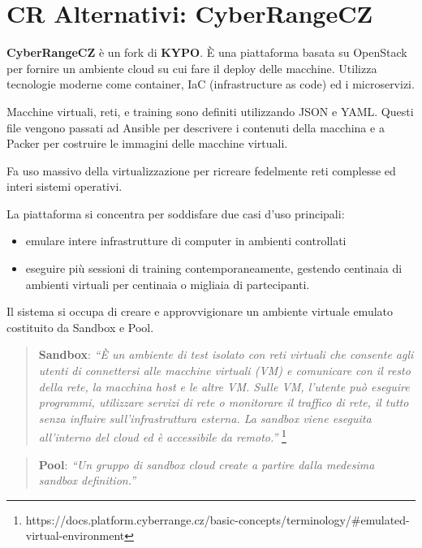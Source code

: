 \section{CR Alternativi:
CyberRangeCZ}\label{cr-alternativi-cyberrangecz}

\textbf{CyberRangeCZ} è un fork di \textbf{KYPO}. È una piattaforma
basata su OpenStack per fornire un ambiente cloud su cui fare il deploy
delle macchine. Utilizza tecnologie moderne come container, IaC
(infrastructure as code) ed i microservizi.

Macchine virtuali, reti, e training sono definiti utilizzando JSON e
YAML. Questi file vengono passati ad Ansible per descrivere i contenuti
della macchina e a Packer per costruire le immagini delle macchine
virtuali.

Fa uso massivo della virtualizzazione per ricreare fedelmente reti
complesse ed interi sistemi operativi.

La piattaforma si concentra per soddisfare due casi d'uso principali:

\begin{itemize}
\tightlist
\item
  emulare intere infrastrutture di computer in ambienti controllati
\item
  eseguire più sessioni di training contemporaneamente, gestendo
  centinaia di ambienti virtuali per centinaia o migliaia di
  partecipanti.
\end{itemize}

Il sistema si occupa di creare e approvvigionare un ambiente virtuale
emulato costituito da Sandbox e Pool.

\begin{quote}
\textbf{Sandbox}: \emph{``È un ambiente di test isolato con reti
virtuali che consente agli utenti di connettersi alle macchine virtuali
(VM) e comunicare con il resto della rete, la macchina host e le altre
VM. Sulle VM, l'utente può eseguire programmi, utilizzare servizi di
rete o monitorare il traffico di rete, il tutto senza influire
sull'infrastruttura esterna. La sandbox viene eseguita all'interno del
cloud ed è accessibile da remoto.''} \footnote{\label{fn:ref_11}https://docs.platform.cyberrange.cz/basic-concepts/terminology/\#emulated-virtual-environment}
\end{quote}

\begin{quote}
\textbf{Pool}: \emph{``Un gruppo di sandbox cloud create a partire dalla
medesima sandbox definition.''} 
\end{quote}

